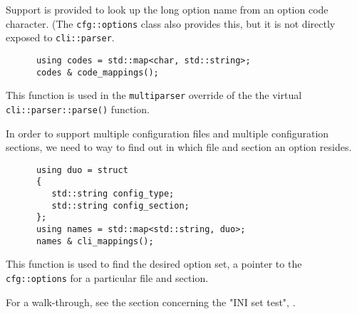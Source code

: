    Support is provided to look up the long option name from an option code
   character. (The \texttt{cfg::options} class also provides this, but it
   is not directly exposed to \texttt{cli::parser}.

   \begin{verbatim}
      using codes = std::map<char, std::string>;
      codes & code_mappings();
   \end{verbatim}

   This function is used in the \texttt{multiparser} override of the
   the virtual \texttt{cli::parser::parse()} function.

   In order to support multiple configuration files and multiple
   configuration sections, we need to way to find out in which file and section
   an option resides.

   \begin{verbatim}
      using duo = struct
      {
         std::string config_type;
         std::string config_section;
      };
      using names = std::map<std::string, duo>;
      names & cli_mappings();
   \end{verbatim}

   This function is used to find the desired option set, a pointer to
   the \texttt{cfg::options} for a particular file and section.

   For a walk-through, see the section concerning the "INI set test",
   .

